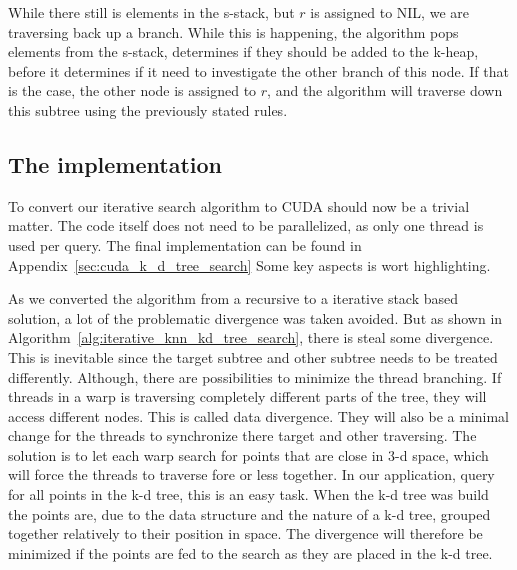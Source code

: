 While there still is elements in the s-stack, but $r$ is assigned to NIL, we are traversing back up a branch. While this is happening, the algorithm pops elements from the s-stack, determines if they should be added to the k-heap, before it determines if it need to investigate the other branch of this node. If that is the case, the other node is assigned to $r$, and the algorithm will traverse down this subtree using the previously stated rules.



\subsection{The implementation} %
\label{sub:the_implementation}

To convert our iterative search algorithm to CUDA should now be a trivial matter. The code itself does not need to be parallelized, as only one thread is used per query. The final implementation can be found in Appendix~\ref{sec:cuda_k_d_tree_search} Some key aspects is wort highlighting.


As we converted the algorithm from a recursive to a iterative stack based solution, a lot of the problematic divergence was taken avoided. But as shown in Algorithm~\ref{alg:iterative_knn_kd_tree_search}, there is steal some divergence. This is inevitable since the target subtree and other subtree needs to be treated differently. Although, there are possibilities to minimize the thread branching. If threads in a warp is traversing completely different parts of the tree, they will access different nodes. This is called data divergence. They will also be a minimal change for the threads to synchronize there target and other traversing. The solution is to let each warp search for points that are close in 3-d space, which will force the threads to traverse fore or less together. In our application, query for all points in the k-d tree, this is an easy task. When the k-d tree was build the points are, due to the data structure and the nature of a k-d tree, grouped together relatively to their position in space. The divergence will therefore be minimized if the points are fed to the search as they are placed in the k-d tree.


